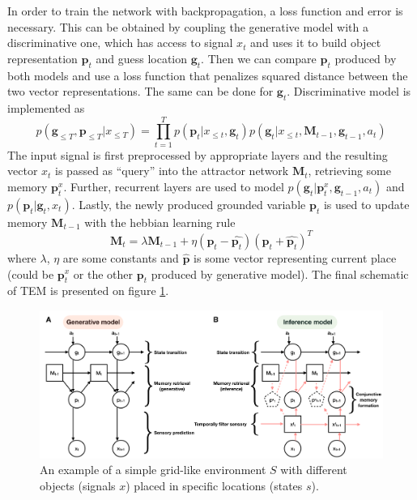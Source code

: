 \documentclass[oneside,english,logo]{amuthesis}
\begin{document}
In order to train the network with backpropagation, a loss function and error is necessary. This can be obtained by coupling the generative model with a discriminative one, which has access to signal $x_{t}$ and uses it to build object representation $\boldsymbol{p}_{t}$ and guess location $\boldsymbol{g}_{t}$. Then we can compare $\boldsymbol{p}_{t}$ produced by both models and use a loss function that penalizes squared distance between the two vector representations. The same can be done for $\boldsymbol{g}_{t}$. Discriminative model is implemented as
\[
p(\boldsymbol{g}_{\le T},\boldsymbol{p}_{\le T}|x_{\le T}) = \prod_{t=1}^T
p(\boldsymbol{p}_t|x_{\le t}, \boldsymbol{g}_{t})
p(\boldsymbol{g}_t|x_{\le t},\boldsymbol{M}_{t-1},\boldsymbol{g}_{t-1},a_t) 
\]
The input signal is first preprocessed by appropriate layers and the resulting vector $x_{t}$ is passed as ``query'' into the attractor network $\boldsymbol{M}_{t}$, retrieving some memory $\boldsymbol{p}^{x}_{t}$. Further, recurrent layers are used to model
$p(\boldsymbol{g}_t|\boldsymbol{p}^{x}_{t},\boldsymbol{g}_{t-1},a_t)$ and $p(\boldsymbol{p}_t|\boldsymbol{g}_t,x_t)$. Lastly, the newly produced grounded variable $\boldsymbol{p}_t$ is used to update memory $\boldsymbol{M}_{t-1}$ with the hebbian learning rule
\[
\boldsymbol{M}_{t} = \lambda \boldsymbol{M}_{t-1} + \eta (\boldsymbol{p}_t - \hat{\boldsymbol{p}_t})(\boldsymbol{p}_t + \hat{\boldsymbol{p}_t})^T
\]
where $\lambda$, $\eta$ are some constants and $\hat{\boldsymbol{p}}$ is some vector representing current place (could be $\boldsymbol{p}^{x}_{t}$ or the other $\boldsymbol{p}_t$ produced by generative model). The final schematic of TEM is presented on figure \ref{fig:tolman_eich}.
\begin{figure}[!htbp]
	\centering
	\includegraphics[width=12cm]{tolman_eich}
	\caption{An example of a simple grid-like environment $S$ with different objects (signals $x$) placed in specific locations (states $s$).}
	\label{fig:tolman_eich}
\end{figure} 
\end{document}
